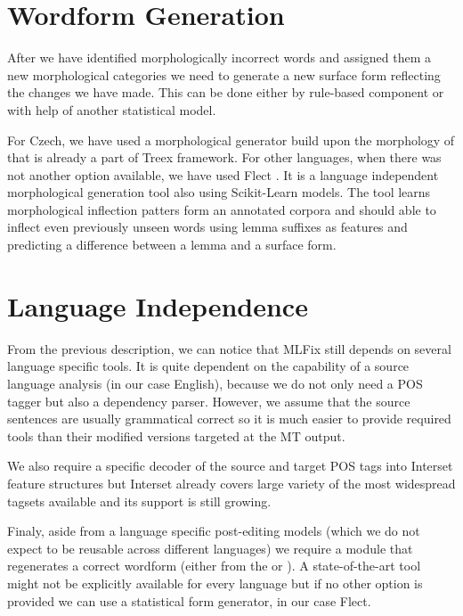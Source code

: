 \section{Wordform Generation}

After we have identified morphologically incorrect words and assigned
them a new morphological categories we need to generate a new surface form reflecting
the changes we have made.
This can be done either by rule-based component or with
help of another statistical model. 

For Czech, we have used a morphological generator build upon the morphology of \citet{HajicHAB2004}
that is already a part of Treex framework. For other languages,
when there was not another option available,
we have used Flect \citep{DBLP:conf/acl/DusekJ13}.
It is a language independent morphological generation tool also using Scikit-Learn
models. The tool learns morphological inflection patters form an annotated corpora and
should able to inflect even previously unseen words using lemma suffixes as features
and predicting a difference between a lemma and a surface form.

\section{Language Independence}

From the previous description, we can notice that MLFix still depends on several
language specific tools. It is quite dependent on the capability of a source
language analysis (in our case English), because we do not only need a POS tagger but also a dependency
parser. However, we assume that the source sentences are usually grammatical correct
so it is much easier to provide required tools than their modified versions
targeted at the MT output.

We also require a specific decoder of the source and target POS tags into Interset feature
structures but Interset already covers large variety of the most widespread tagsets available
and its support is still growing.

Finaly, aside from a language specific post-editing models (which we do not expect
to be reusable across different languages) we require a module that regenerates
a correct wordform (either from the  or ).
A state-of-the-art tool might not be explicitly available for every language but if no
other option is provided we can use a statistical form generator, in our case Flect.
